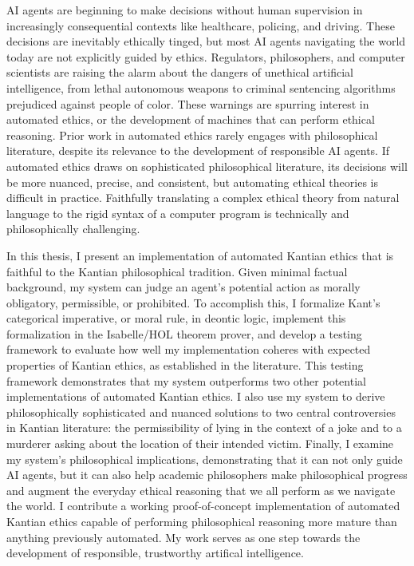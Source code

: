 %
\begin{isabellebody}%
%
%
\isadelimtheory
%
\endisadelimtheory
%
\isatagtheory
%
\endisatagtheory
{\isafoldtheory}%
%
\isadelimtheory
%
\endisadelimtheory
%
\begin{isamarkuptext}%
AI agents are beginning to make decisions without human supervision in increasingly consequential 
contexts like healthcare, policing, and driving. These decisions are inevitably ethically tinged, 
but most AI agents navigating the world today are not explicitly guided by ethics.
Regulators, philosophers, and computer scientists are raising the alarm about the 
dangers of unethical artificial intelligence, from lethal autonomous weapons to criminal
sentencing algorithms prejudiced against people of color. These warnings are spurring interest in 
automated ethics, or the development of machines that can perform ethical reasoning. Prior work in 
automated ethics rarely engages with philosophical literature, despite its relevance to the 
development of responsible AI agents. If automated ethics draws on sophisticated philosophical
literature, its decisions will be more nuanced, precise, and consistent, but automating ethical theories is 
difficult in practice. Faithfully translating a complex ethical theory from natural language to the 
rigid syntax of a computer program is technically and philosophically challenging.

In this thesis, I present an implementation of automated Kantian
ethics that is faithful to the Kantian philosophical tradition. Given minimal factual background, my 
system can judge an agent's potential action as morally obligatory, permissible, or prohibited.
To accomplish this, I formalize Kant's categorical imperative, or moral rule,
in deontic logic, implement this formalization 
in the Isabelle/HOL theorem prover, and develop a testing framework to evaluate how well 
my implementation coheres with expected properties of Kantian ethics, as established in the literature. 
This testing framework demonstrates that my system outperforms two other potential implementations of 
automated Kantian ethics. I also use my system to derive philosophically sophisticated and nuanced 
solutions to two central controversies in Kantian literature: the permissibility of lying in the 
context of a joke and to a murderer asking about the location of their intended victim. Finally, I 
examine my system's philosophical implications, demonstrating that it can not only guide AI agents, but it can
also help academic philosophers make philosophical progress and augment the everyday ethical reasoning
that we all perform as we navigate the world. I contribute a working proof-of-concept implementation
of automated Kantian ethics capable of performing philosophical reasoning more mature than anything previously
automated. My work serves as one step towards the development of responsible, trustworthy artifical intelligence.%
\end{isamarkuptext}\isamarkuptrue%
%
\isadelimtheory
%
\endisadelimtheory
%
\isatagtheory
%
\endisatagtheory
{\isafoldtheory}%
%
\isadelimtheory
%
\endisadelimtheory
%
\end{isabellebody}%
